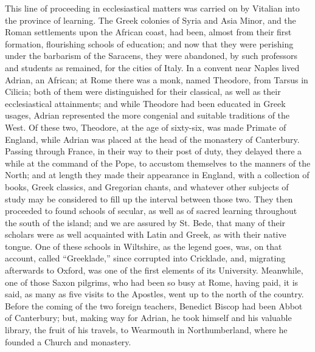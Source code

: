 This line of proceeding in ecclesiastical matters was carried on by
Vitalian into the province of learning. The Greek colonies of Syria
and Asia Minor, and the Roman settlements upon the African coast, had
been, almost from their first formation, flourishing schools of
education; and now that they were perishing under the barbarism of the
Saracens, they were abandoned, by such professors and students as
remained, for the cities of Italy. In a convent near Naples lived
Adrian, an African; at Rome there was a monk, named Theodore, from
Tarsus in Cilicia; both of them were distinguished for their
classical, as well as their ecclesiastical attainments; and while
Theodore had been educated in Greek usages, Adrian represented the
more congenial and suitable traditions of the West. Of these two,
Theodore, at the age of sixty-six, was made Primate of England, while Adrian was placed at the head of the monastery of Canterbury.
Passing through France, in their way to their post of duty, they
delayed there a while at the command of the Pope, to accustom
themselves to the manners of the North; and at length they made their
appearance in England, with a collection of books, Greek classics, and
Gregorian chants, and whatever other subjects of study may be
considered to fill up the interval between those two. They then
proceeded to found schools of secular, as well as of sacred learning
throughout the south of the island; and we are assured by St. Bede,
that many of their scholars were as well acquainted with Latin and
Greek, as with their native tongue. One of these schools in Wiltshire,
as the legend goes, was, on that account, called ``Greeklade,''
since corrupted into Cricklade, and, migrating afterwards to Oxford,
was one of the first elements of its University. Meanwhile, one of
those Saxon pilgrims, who had been so busy at Rome, having paid, it is
said, as many as five visits to the Apostles, went up to the north of
the country. Before the coming of the two foreign teachers, Benedict
Biscop had been Abbot of Canterbury; but, making way for Adrian, he
took himself and his valuable library, the fruit of his travels, to
Wearmouth in Northumberland, where he founded a Church and monastery.

